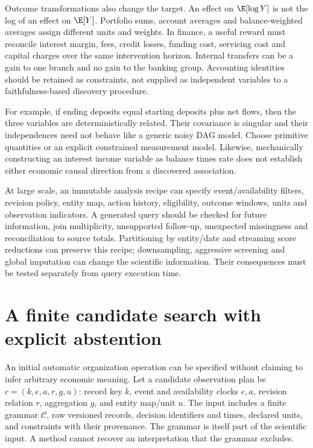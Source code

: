 Outcome transformations also change the target. An effect on
$\E[\log Y]$ is not the log of an effect on $\E[Y]$.
Portfolio sums, account averages and balance-weighted averages assign
different units and weights. In finance, a useful reward must reconcile
interest margin, fees, credit losses, funding cost, servicing cost and
capital charges over the same intervention horizon. Internal transfers
can be a gain to one branch and no gain to the banking group. Accounting
identities should be retained as constraints, not supplied as independent
variables to a faithfulness-based discovery procedure.

For example, if ending deposits equal starting deposits plus net flows,
then the three variables are deterministically related. Their covariance
is singular and their independences need not behave like a generic
noisy DAG model. Choose primitive quantities or an explicit constrained
measurement model. Likewise, mechanically constructing an interest
income variable as balance times rate does not establish either economic
causal direction from a discovered association.

At large scale, an immutable analysis recipe can specify event/availability
filters, revision policy, entity map, action history, eligibility, outcome
windows, units and observation indicators. A generated query should be
checked for future information, join multiplicity, unsupported follow-up,
unexpected missingness and reconciliation to source totals. Partitioning
by entity/date and streaming score reductions can preserve this recipe;
downsampling, aggressive screening and global imputation can change the
scientific information. Their consequences must be tested separately
from query execution time.



\section{A finite candidate search with explicit abstention}
\label{s4:organization-algorithm}
An initial automatic organization operation can be specified without
claiming to infer arbitrary economic meaning. Let a candidate observation
plan be $c=(k,e,a,r,g,u)$: record key $k$, event and availability clocks
$e,a$, revision relation $r$, aggregation $g$, and entity map/unit $u$.
The input includes a finite grammar $\mathcal C$, raw versioned records,
decision identifiers and times, declared units, and constraints with their
provenance. The grammar is itself part of the scientific input. A method
cannot recover an interpretation that the grammar excludes.

